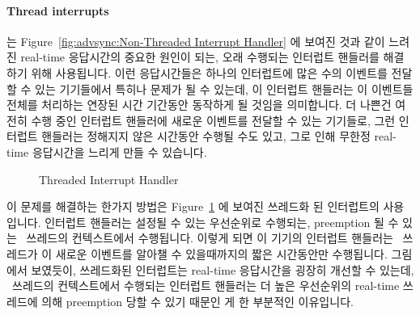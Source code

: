 \paragraph{Thread interrupts}
는
Figure~\ref{fig:advsync:Non-Threaded Interrupt Handler} 에 보여진 것과 같이
느려진 real-time 응답시간의 중요한 원인이 되는, 오래 수행되는 인터럽트 핸들러를
해결하기 위해 사용됩니다.
이런 응답시간들은 하나의 인터럽트에 많은 수의 이벤트를 전달할 수 있는
기기들에서 특히나 문제가 될 수 있는데, 이 인터럽트 핸들러는 이 이벤트들 전체를
처리하는 연장된 시간 기간동안 동작하게 될 것임을 의미합니다.
더 나쁜건 여전히 수행 중인 인터럽트 핸들러에 새로운 이벤트를 전달할 수 있는
기기들로, 그런 인터럽트 핸들러는 정해지지 않은 시간동안 수행될 수도 있고, 그로
인해 무한정 real-time 응답시간을 느리게 만들 수 있습니다.

\begin{figure}[tb]
\centering
{}
\caption{Threaded Interrupt Handler}
\label{fig:advsync:Threaded Interrupt Handler}
\end{figure}

이 문제를 해결하는 한가지 방법은
Figure~\ref{fig:advsync:Threaded Interrupt Handler} 에 보여진 쓰레드화 된 인터럽트의
사용입니다.
인터럽트 핸들러는 설정될 수 있는 우선순위로 수행되는, preemption 될 수 있는
\IRQ\ 쓰레드의 컨텍스트에서 수행됩니다.
이렇게 되면 이 기기의 인터럽트 핸들러는 \IRQ\ 쓰레드가 이 새로운 이벤트를
알아챌 수 있을때까지의 짧은 시간동안만 수행됩니다.
그림에서 보였듯이, 쓰레드화된 인터럽트는 real-time 응답시간을 굉장히 개선할 수
있는데, \IRQ\ 쓰레드의 컨텍스트에서 수행되는 인터럽트 핸들러는 더 높은
우선순위의 real-time 쓰레드에 의해 preemption 당할 수 있기 때문인 게 한
부분적인 이유입니다.
\iffalse

